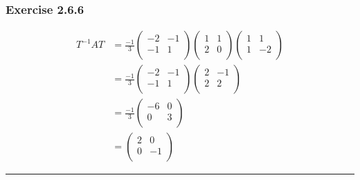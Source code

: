 \documentclass[12pt, letterpaper]{scrartcl}
\begin{document}
\subsubsection*{Exercise 2.6.6}
\begin{align*}
    T^{-1}AT
    &=\frac{-1}{3}\left(\begin{array}{cc} 
    -2 & -1 \\ -1 & 1 \\ 
    \end{array}\right)
    \left(\begin{array}{cc} 
    1 & 1 \\ 2 & 0 \\ 
    \end{array}\right)
    \left(\begin{array}{cc} 
    1 & 1 \\ 1 & -2 \\ 
    \end{array}\right)\\
    &=\frac{-1}{3}\left(\begin{array}{cc} 
    -2 & -1 \\ -1 & 1 \\ 
    \end{array}\right)
    \left(\begin{array}{cc} 
    2 & -1 \\ 2 & 2 \\ 
    \end{array}\right)\\
    &=\frac{-1}{3}\left(\begin{array}{cc} 
    -6 & 0 \\ 0 & 3 \\ 
    \end{array}\right)\\
    &=\left(\begin{array}{cc}
        2 & 0 \\
        0 & -1 \\
    \end{array}\right)
\end{align*}
\vskip1mm\hrule
\end{document}
